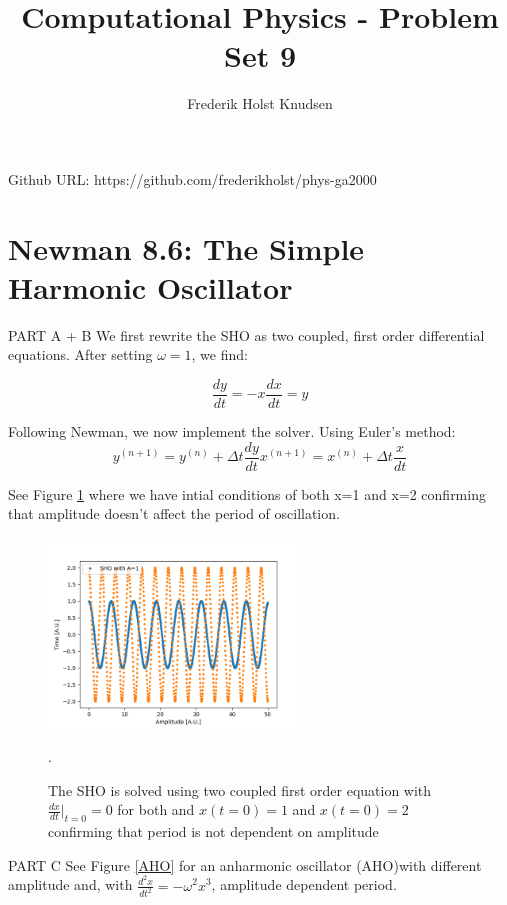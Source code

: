 \documentclass[11pt]{article}
\title{Computational Physics -  Problem Set 9}
\author{Frederik Holst Knudsen}
\begin{document}
\maketitle
Github URL: https://github.com/frederikholst/phys-ga2000
\section{Newman 8.6: The Simple Harmonic Oscillator}

PART A + B
We first rewrite the SHO as two coupled, first order differential equations. After setting $\omega=1$, we find:

\begin{equation}
    \frac{dy}{dt}=-x
    \frac{dx}{dt}=y
\end{equation}

Following Newman, we now implement the solver. Using Euler's method: 
\begin{equation}
    y^{(n+1)}=y^{(n)}+\Delta t \frac{dy}{dt}
    x^{(n+1)}=x^{(n)}+\Delta t \frac{x}{dt}
\end{equation}

See Figure \ref{SHO} where we have intial conditions of both x=1 and x=2 confirming that amplitude doesn't affect the period of oscillation. 
\begin{figure}[!htbp]
    \centering
    \includegraphics[width=0.6\textwidth]{SHO1.png}
    \caption{The SHO is solved using two coupled first order equation with $\frac{dx}{dt}|_{t=0}=0$ for both and $x(t=0)=1$ and $x(t=0)=2$ confirming that period is not dependent on amplitude}.
    \label{SHO}
\end{figure}

PART C
See Figure \ref{AHO} for an anharmonic oscillator  (AHO)with different amplitude and, with $\frac{d^2x}{dt^2}=-\omega^2x^3$, amplitude dependent period. 
\end{document}
